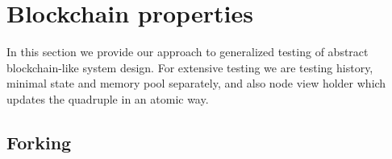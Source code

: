 
\section{Blockchain properties}

In this section we provide our approach to generalized testing of abstract blockchain-like system design. For extensive testing we are  testing history, minimal state and memory pool separately, and also node view holder which updates the quadruple {\em <history, minimal state, vault, memory pool>} in an atomic way. 

\subsection{Forking}


